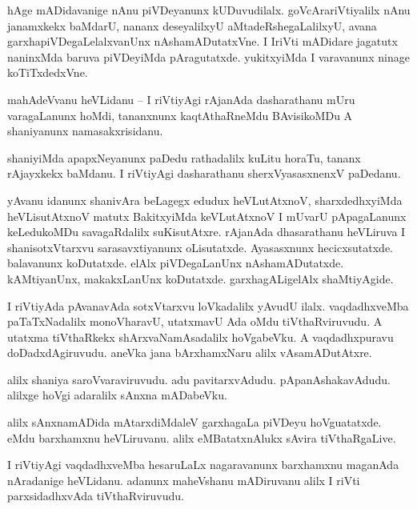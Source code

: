 \documentclass{article}
\begin{document}
\begin{mn}%
hAge mADidavanige nAnu piVDeyanunx kUDuvudilalx. goVcArariVtiyalilx nAnu janamxkekx baMdarU, nananx 
deseyalilxyU aMtadeRshegaLalilxyU, avana garxhapiVDegaLelalxvanUnx nAshamADutatxVne. I IriVti 
mADidare jagatutx naninxMda baruva piVDeyiMda pAragutatxde. yukitxyiMda I varavanunx ninage 
koTiTxdedxVne.
\end{mn}

\begin{mn}%
mahAdeVvanu heVLidanu -- I riVtiyAgi rAjanAda dasharathanu mUru varagaLanunx hoMdi, tananxnunx 
kaqtAthaRneMdu BAvisikoMDu A shaniyanunx namasakxrisidanu.
\end{mn}

\begin{mn}%
shaniyiMda apapxNeyanunx paDedu rathadalilx kuLitu horaTu, tananx rAjayxkekx baMdanu. I riVtiyAgi 
dasharathanu sherxVyasasxnenxV paDedanu.
\end{mn}

\begin{mn}%
yAvanu idanunx shanivAra beLagegx edudux heVLutAtxnoV, sharxdedhxyiMda heVLisutAtxnoV matutx 
BakitxyiMda keVLutAtxnoV I mUvarU pApagaLanunx keLedukoMDu savagaRdalilx suKisutAtxre. rAjanAda 
dhasarathanu heVLiruva I shanisotxVtarxvu sarasavxtiyanunx oLisutatxde. Ayasasxnunx 
hecicxsutatxde. balavanunx koDutatxde. elAlx piVDegaLanUnx nAshamADutatxde. kAMtiyanUnx, 
makakxLanUnx koDutatxde. garxhagALigelAlx shaMtiyAgide.
\end{mn}

\begin{mn}%
I riVtiyAda pAvanavAda sotxVtarxvu loVkadalilx yAvudU ilalx. vaqdadhxveMba paTaTxNadalilx 
monoVharavU, utatxmavU Ada oMdu tiVthaRviruvudu. A utatxma tiVthaRkekx shArxvaNamAsadalilx 
hoVgabeVku. A vaqdadhxpuravu doDadxdAgiruvudu. aneVka jana bArxhamxNaru alilx vAsamADutAtxre.
\end{mn}

\begin{mn}%
alilx shaniya saroVvaraviruvudu. adu pavitarxvAdudu. pApanAshakavAdudu. alilxge hoVgi adaralilx 
sAnxna mADabeVku.
\end{mn}

\begin{mn}%
alilx sAnxnamADida mAtarxdiMdaleV garxhagaLa piVDeyu hoVguatatxde. eMdu barxhamxnu heVLiruvanu. 
alilx eMBatatxnAlukx sAvira tiVthaRgaLive.
\end{mn}

\begin{mn}%
I riVtiyAgi vaqdadhxveMba hesaruLaLx nagaravanunx barxhamxnu maganAda nAradanige heVLidanu. adanunx 
maheVshanu mADiruvanu alilx I riVti parxsidadhxvAda tiVthaRviruvudu.
\end{mn}
\end{document}
